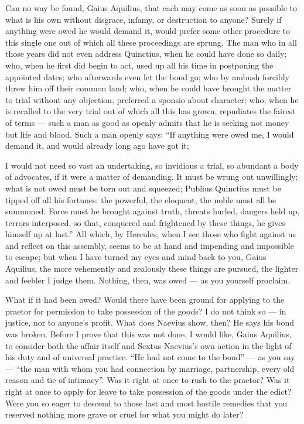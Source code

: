  Can no way be found, Gaius Aquilius, that each may come as soon as possible to what is his own without disgrace, infamy, or destruction to anyone? Surely if anything were owed he would demand it, would prefer some other procedure to this single one out of which all these proceedings are sprung. The man who in all those years did not even address Quinctius, when he could have done so daily; who, when he first did begin to act, used up all his time in postponing the appointed dates; who afterwards even let the bond go; who by ambush forcibly threw him off their common land; who, when he could have brought the matter to trial without any objection, preferred a sponsio about character; who, when he is recalled to the very trial out of which all this has grown, repudiates the fairest of terms --- such a man as good as openly admits that he is seeking not money but life and blood. Such a man openly says: ``If anything were owed me, I would demand it, and would already long ago have got it;

 I would not need so vast an undertaking, so invidious a trial, so abundant a body of advocates, if it were a matter of demanding. It must be wrung out unwillingly; what is not owed must be torn out and squeezed; Publius Quinctius must be tipped off all his fortunes; the powerful, the eloquent, the noble must all be summoned. Force must be brought against truth, threats hurled, dangers held up, terrors interposed, so that, conquered and frightened by these things, he gives himself up at last.'' All which, by Hercules, when I see those who fight against us and reflect on this assembly, seems to be at hand and impending and impossible to escape; but when I have turned my eyes and mind back to you, Gaius Aquilius, the more vehemently and zealously these things are pursued, the lighter and feebler I judge them. Nothing, then, was owed --- as you yourself proclaim.

 What if it had been owed? Would there have been ground for applying to the praetor for permission to take possession of the goods? I do not think so --- in justice, nor to anyone's profit. What does Naevius show, then? He says his bond was broken. Before I prove that this was not done, I would like, Gaius Aquilius, to consider both the affair itself and Sextus Naevius's own action in the light of his duty and of universal practice. ``He had not come to the bond'' --- as you say --- ``the man with whom you had connection by marriage, partnership, every old reason and tie of intimacy''. Was it right at once to rush to the praetor? Was it right at once to apply for leave to take possession of the goods under the edict? Were you so eager to descend to those last and most hostile remedies that you reserved nothing more grave or cruel for what you might do later?

